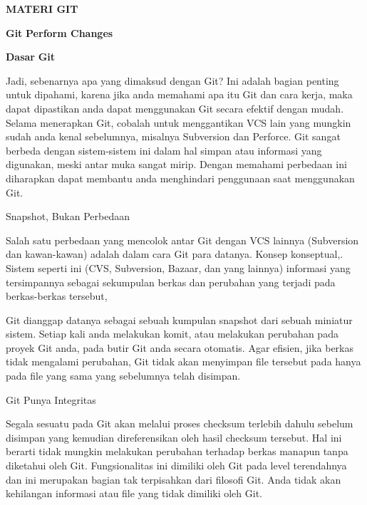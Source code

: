 
\sloppy
\begin{center}{\fontsize{16pt}{16pt}\selectfont \textbf{MATERI GIT} \\}\end{center} \par
\noindent 
\begin{center}{\fontsize{14pt}{14pt}\selectfont \textbf{Git}\textbf{ Perform Changes} \\}\end{center} \par
\vspace{12pt}
\noindent 
{\fontsize{14pt}{14pt}\selectfont \textbf{Dasar}\textbf{ }\textbf{Git} \\} \par
\noindent 
Jadi, sebenarnya apa yang dimaksud dengan Git? Ini adalah bagian penting untuk dipahami, karena jika anda memahami apa itu Git dan cara kerja, maka dapat dipastikan anda dapat menggunakan Git secara efektif dengan mudah. Selama menerapkan Git, cobalah untuk menggantikan VCS lain yang mungkin sudah anda kenal sebelumnya, misalnya Subversion dan Perforce. Git sangat berbeda dengan sistem-sistem ini dalam hal simpan atau informasi yang digunakan, meski antar muka sangat mirip. Dengan memahami perbedaan ini diharapkan dapat membantu anda menghindari penggunaan saat menggunakan Git. \par
\noindent 
Snapshot, Bukan Perbedaan \par
\noindent 
Salah satu perbedaan yang mencolok antar Git dengan VCS lainnya (Subversion dan kawan-kawan) adalah dalam cara Git para datanya. Konsep konseptual,. Sistem seperti ini (CVS, Subversion, Bazaar, dan yang lainnya) informasi yang tersimpannya sebagai sekumpulan berkas dan perubahan yang terjadi pada berkas-berkas tersebut, \par
\noindent 
Git dianggap datanya sebagai sebuah kumpulan snapshot dari sebuah miniatur sistem. Setiap kali anda melakukan komit, atau melakukan perubahan pada proyek Git anda, pada butir Git anda secara otomatis. Agar efisien, jika berkas tidak mengalami perubahan, Git tidak akan menyimpan file tersebut pada hanya pada file yang sama yang sebelumnya telah disimpan. \par
\vspace{12pt}
\noindent 
Git Punya Integritas \par
\noindent 
Segala sesuatu pada Git akan melalui proses checksum terlebih dahulu sebelum disimpan yang kemudian direferensikan oleh hasil checksum tersebut. Hal ini berarti tidak mungkin melakukan perubahan terhadap berkas manapun tanpa diketahui oleh Git. Fungsionalitas ini dimiliki oleh Git pada level terendahnya dan ini merupakan bagian tak terpisahkan dari filosofi Git. Anda tidak akan kehilangan informasi atau file yang tidak dimiliki oleh Git. \par
